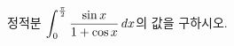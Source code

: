 \hspace*{2mm}\begin{minipage}[t]{\dimexpr\linewidth-2mm\relax}\vspace{0pt}
정적분 $\displaystyle\int_{0}^{\frac{\pi}{2}}\dfrac{\sin x}{1+\cos x}\mkern3mu dx$의 값을 구하시오.\end{minipage}
